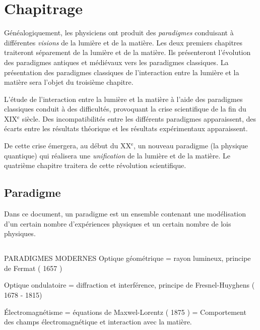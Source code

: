 \section{Chapitrage}
% 
Généalogiquement, les physiciens ont produit des {\it paradigmes} conduisant à différentes {\it visions} de la lumière et de la matière.
Les deux premiers chapitres traiteront séparement de la lumière et de la matière. Ils présenteront l'évolution des paradigmes antiques et médiévaux vers les paradigmes classiques.
La présentation des paradigmes classiques de l'interaction entre la lumière et la matière sera l'objet du troisième chapitre.

L'étude de l'interaction entre la lumière et la matière à l'aide des paradigmes classiques conduit à des difficultés, provoquant la crise scientifique de la fin du {\footnotesize XIX}$^\text{e}$ siècle. Des incompatibilités entre les différents paradigmes apparaissent, des écarts entre les résultats théorique et les résultats expérimentaux apparaissent.

De cette crise émergera, au début du {\footnotesize XX}$^\text{e}$, un nouveau paradigme (la physique quantique) qui réalisera une {\it unification} de la lumière et de la matière.
Le quatrième chapitre traitera de cette révolution scientifique.

\subsection{Paradigme}
Dans ce document, un paradigme est un ensemble contenant une modélisation d'un certain nombre d'expériences physiques et un certain nombre de lois physiques.

\subsection{}
\begin{center}
\end{center}

\begin{comment}
\end{comment}

PARADIGMES MODERNES
	Optique géométrique = rayon lumineux, principe de Fermat ( 1657 )

	Optique ondulatoire = diffraction et interférence, principe de Fresnel-Huyghens ( 1678 - 1815)

	Électromagnétisme =  équations de Maxwel-Lorentz ( 1875 ) = Comportement des champs électromagnétique et interaction avec la matière.


